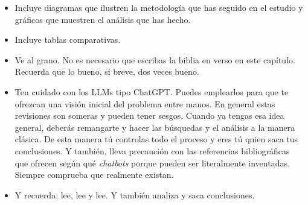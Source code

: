 \begin{itemize}
    \item Incluye diagramas que ilustren la metodología que has seguido en el estudio y gráficos que muestren el análisis que has hecho.
    \item Incluye tablas comparativas.
    \item Ve al grano. No es necesario que escribas la biblia en verso en este capítulo. Recuerda que lo bueno, si breve, dos veces bueno.
    \item Ten cuidado con los LLMs tipo ChatGPT. Puedes emplearlos para que te ofrezcan una visión inicial del problema entre manos. En general estas revisiones son someras y pueden tener sesgos. Cuando ya tengas esa idea general, deberás remangarte y hacer las búsquedas y el análisis a la manera clásica. De esta manera tú controlas todo el proceso y eres tú quien saca tus conclusiones. Y también, lleva precaución con las referencias bibliográficas que ofrecen según qué \textit{chatbots} porque pueden ser literalmente inventadas. Siempre comprueba que realmente existan. 
    \item Y recuerda: lee, lee y lee. Y también analiza y saca conclusiones.
\end{itemize}
